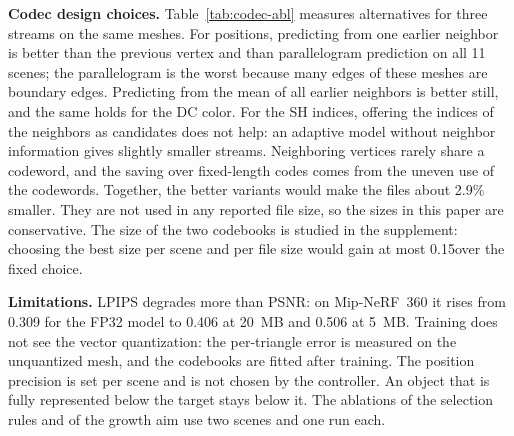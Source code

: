 \noindent\textbf{Codec design choices.} Table~\ref{tab:codec-abl} measures alternatives for three streams on the same meshes. For positions, predicting from one earlier neighbor is better than the previous vertex and than parallelogram prediction on all 11 scenes; the parallelogram is the worst because many edges of these meshes are boundary edges. Predicting from the mean of all earlier neighbors is better still, and the same holds for the DC color. For the SH indices, offering the indices of the neighbors as candidates does not help: an adaptive model without neighbor information gives slightly smaller streams. Neighboring vertices rarely share a codeword, and the saving over fixed-length codes comes from the uneven use of the codewords. Together, the better variants would make the files about 2.9\% smaller. They are not used in any reported file size, so the sizes in this paper are conservative. The size of the two codebooks is studied in the supplement: choosing the best size per scene and per file size would gain at most 0.15\dB over the fixed choice.

\noindent\textbf{Limitations.} LPIPS degrades more than PSNR: on Mip-NeRF~360 it rises from 0.309 for the FP32 model to 0.406 at 20~MB and 0.506 at 5~MB. Training does not see the vector quantization: the per-triangle error is measured on the unquantized mesh, and the codebooks are fitted after training. The position precision is set per scene and is not chosen by the controller. An object that is fully represented below the target stays below it. The ablations of the selection rules and of the growth aim use two scenes and one run each.


